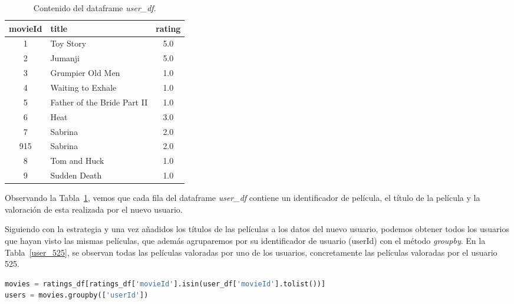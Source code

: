 \documentclass{uimppracticas}
\begin{document}
\begin{table}[H]
	\centering
	\begin{tabular}{clc}
		\toprule
		movieId &                  title &  rating \\
		\midrule
		1 &                    Toy Story &     5.0 \\
		2 &                      Jumanji &     5.0 \\
		3 &             Grumpier Old Men &     1.0 \\
		4 &            Waiting to Exhale &     1.0 \\
		5 &  Father of the Bride Part II &     1.0 \\
		6 &                         Heat &     3.0 \\
		7 &                      Sabrina &     2.0 \\
		915 &                      Sabrina &     2.0 \\
		8 &                 Tom and Huck &     1.0 \\
		9 &                 Sudden Death &     1.0 \\
		\bottomrule
	\end{tabular}
	\caption{Contenido del dataframe \textit{user\_df}.}
	\label{user_df}
\end{table}

Observando la Tabla~\ref{user_df}, vemos que cada fila del dataframe \textit{user\_df} contiene un identificador de película, el título de la película y la valoración de esta realizada por el nuevo usuario. 

Siguiendo con la estrategia y una vez añadidos los títulos de las películas a los datos del nuevo usuario, podemos obtener todos los usuarios que hayan visto las mismas películas, que además agruparemos por su identificador de usuario (userId) con el método \textit{groupby}. En la Tabla~\ref{user_525}, se observan todas las películas valoradas por uno de los usuarios, concretamente las películas valoradas por el usuario 525.

\begin{lstlisting}[language=python, basicstyle=\footnotesize, belowskip=-0.5 \baselineskip]
movies = ratings_df[ratings_df['movieId'].isin(user_df['movieId'].tolist())]
users = movies.groupby(['userId'])
\end{lstlisting}
\end{document}
